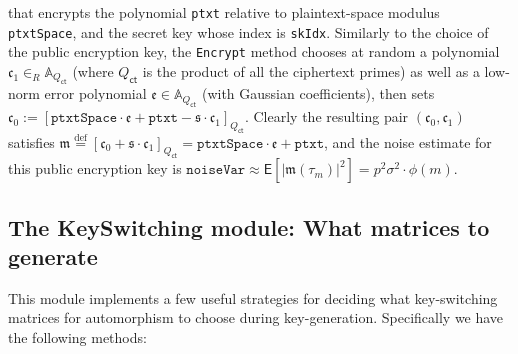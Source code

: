 \documentclass[14pt]{extarticle}
\newcommand{\A}{\mathbb{A}}
\def\Qct{Q_\mathsf{ct}}
\def\eqdef{\stackrel{\mathrm{def}}{=}}
\def\KeySwitching{\textsf{KeySwitching}}
\def\EXP{\mathsf{E}}
\newcommand{\ee}{\mathfrak{e}}
\newcommand{\ct}{\mathfrak{c}}
\newcommand{\mm}{\mathfrak{m}}
\newcommand{\sk}{\mathfrak{s}}
\begin{document}
\smallskip\noindent
that encrypts the polynomial \texttt{ptxt} relative to plaintext-space
modulus \texttt{ptxtSpace}, and the secret key whose index is
\texttt{skIdx}. Similarly to the choice of the public encryption
key, the \texttt{Encrypt} method chooses at random a polynomial $\ct_1
\in_R\A_{\Qct}$ (where $\Qct$ is the product of all the ciphertext
primes) as well as a low-norm error polynomial $\ee\in\A_{\Qct}$ (with
Gaussian coefficients), then sets $\ct_0:= [\texttt{ptxtSpace}\cdot
\ee +\texttt{ptxt} - \sk\cdot\ct_1]_{\Qct}$. Clearly the resulting
pair $(\ct_0,\ct_1)$ satisfies $\mm\eqdef[\ct_0+\sk\cdot\ct_1]_{\Qct}
=\mathtt{ptxtSpace}\cdot\ee+\mathtt{ptxt}$, and the noise estimate for
this public encryption key is $\mathtt{noiseVar}\approx
\EXP[|\mm(\tau_m)|^2]=p^2\sigma^2\cdot\phi(m)$.


\subsection{The {\KeySwitching} module: What matrices to generate}
\label{sec:KswStrategies}
This module implements a few useful strategies for deciding
what key-switching matrices for automorphism to choose during
key-generation. Specifically we have the following methods:
\end{document}
